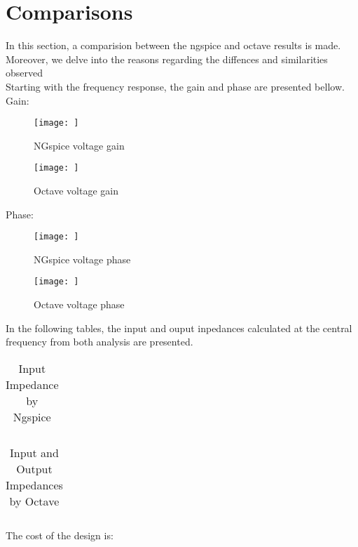 \section{Comparisons}
\label{sec:comparsisons}

In this section, a comparision between the ngspice and octave results is made. Moreover, we delve into the reasons regarding the diffences and similarities observed\\
Starting with the frequency response, the gain and phase are presented bellow.
Gain:
\begin{figure} [!htb] 
  \texttt{[image: ]}
  \caption{NGspice voltage gain}
  \label{fig:theoplots}
  \endminipage\hfill
\end{figure}

\begin{figure} [!htb] 
  \texttt{[image: ]}
  \caption{Octave voltage gain}
  \label{fig:theoplots}
  \endminipage\hfill
\end{figure}

Phase:
\begin{figure} [!htb] 
  \texttt{[image: ]}
  \caption{NGspice voltage phase}
  \label{fig:theoplots}
  \endminipage\hfill
\end{figure}

\begin{figure} [!htb] 
  \texttt{[image: ]}
  \caption{Octave voltage phase}
  \label{fig:theoplots}
  \endminipage\hfill
\end{figure}

In the following tables, the input and ouput inpedances  calculated at the central frequency from both analysis are presented.
\FloatBarrier
\begin{table}[h]
  \centering
  \begin{tabular}{|c|c|}
    \hline    
    
    \hline
  \end{tabular}
  \caption{Input Impedance by Ngspice}
  \label{tab:Spice1}
\end{table}
\FloatBarrier   

\FloatBarrier
\begin{table}[h]
  \centering
  \begin{tabular}{|c|c|c|c|}
    \hline    
    
    \hline
  \end{tabular}
  \caption{Input and Output Impedances by Octave}
  \label{tab:Spice1}
\end{table}
\FloatBarrier   

The cost of the design is: \\


